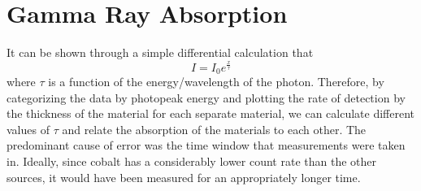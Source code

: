 \documentclass[12pt, a4paper]{article}
\begin{document}
\section{Gamma Ray Absorption}
	It can be shown through a simple differential calculation that
	\begin{equation}
		I = I_0 e^{\frac{x}{\tau}}
	\end{equation}
	where $\tau$ is a function of the energy/wavelength of the photon. Therefore, by categorizing the data by photopeak energy and plotting the rate of detection by the thickness of the material for each separate material, we can calculate different values of $\tau$ and relate the absorption of the materials to each other. The predominant cause of error was the time window that measurements were taken in. Ideally, since cobalt has a considerably lower count rate than the other sources, it would have been measured for an appropriately longer time.
\end{document}
